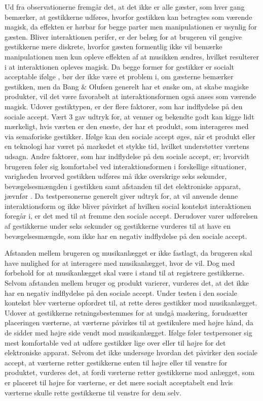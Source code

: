 Ud fra observationerne fremgår det, at det ikke er alle gæster, som hver gang bemærker, at gestikkerne udføres, hvorfor gestikken kan betragtes som værende magisk, da effekten er hørbar for begge parter men manipulationen er usynlig for gæsten. Bliver interaktionen perifer, er der belæg for at brugeren vil gengive gestikkerne mere diskrete, hvorfor gæsten formentlig ikke vil bemærke manipulationen men kun opleve effekten af at musikken ændres, hvilket resulterer i at interaktionen opleves magisk. Da begge former for gestikker er socialt acceptable ifølge \textcite[s. 277]{PDF:WouldYouDoThat}, bør der ikke være et problem i, om gæsterne bemærker gestikken, men da Bang $\&$ Olufsen generelt har et ønske om, at skabe magiske produkter, vil det være favorabelt at interaktionsformen også anses som værende magisk.\blankline
%
Udover gestiktypen, er der flere faktorer, som har indflydelse på den sociale accept. Vært 3 gav udtryk for, at venner og bekendte godt kan kigge lidt mærkeligt, hvis værten er den eneste, der har et produkt, som interageres med via semaforiske gestikker. Ifølge \textcite[s. 276]{PDF:WouldYouDoThat} kan den sociale accept øges, når et produkt eller en teknologi har været på markedet et stykke tid, hvilket understøtter værtens udsagn. Andre faktorer, som har indflydelse på den sociale accept, er; hvorvidt brugeren føler sig komfortabel ved interaktionsformen i forskellige situationer, varigheden hvorved gestikken udføres må ikke overskrige seks sekunder, bevægelsesmængden i gestikken samt afstanden til det elektroniske apparat, jævnfør . Da testpersonerne generelt giver udtryk for, at vil anvende denne interaktionsform og ikke bliver påvirket af hvilken social kontekst interaktionen foregår i, er det med til at fremme den sociale accept. Derudover varer udførelsen af gestikkerne under seks sekunder og gestikkerne vurderes til at have en bevægelsesmængde, som ikke har en negativ indflydelse på den sociale accept. 

Afstanden mellem brugeren og musikanlægget er ikke fastlagt, da brugeren skal have mulighed for at interagere med musikanlægget, hvor de vil. Dog med forbehold for at musikanlægget skal være i stand til at registrere gestikkerne. Selvom afstanden mellem bruger og produkt varierer, vurderes det, at det ikke har en negativ indflydelse på den sociale accept.\blankline
%
Under testen i den sociale kontekst blev værterne opfordret til, at rette deres gestikker mod musikanlægget. Udover at gestikkerne retningsbestemmes for at undgå maskering, forudsætter placeringen værterne, at værterne påvirkes til at gestikulere med højre hånd, da de sidder med højre side vendt mod musikanlægget. Ifølge \textcite[s. 197]{PDF:AreYouComfortableDoingThat} føler testpersoner sig mest komfortable ved at udføre gestikker lige over eller til højre for det elektroniske apparat. Selvom det ikke undersøge hvordan det påvirker den sociale accept, at værterne retter gestikkerne enten til højre eller til venstre for produktet, vurderes det, at fordi værterne retter gestikkerne mod anlægget, som er placeret til højre for værterne, er det mere socialt acceptabelt end hvis værterne skulle rette gestikkerne til venstre for dem selv. 

